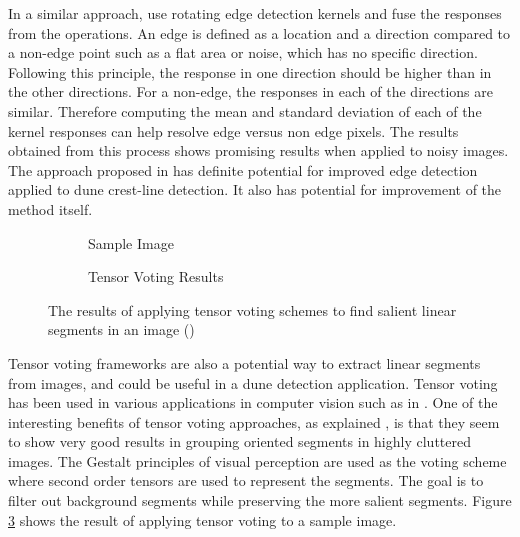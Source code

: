 In a similar approach, \cite{Image_Edge_detection_Rotating_Kernel_Transformation} use rotating edge detection kernels and fuse the responses from the operations. An edge is defined as a location and a direction compared to a non-edge point such as a flat area or noise, which has no specific direction. Following this principle, the response in one direction should be higher than in the other directions. For a non-edge, the	responses in each of the directions are similar. Therefore computing the mean and standard deviation of each of the kernel responses can help resolve edge versus non edge pixels. The results obtained from this process shows promising results when applied to noisy images. The approach proposed in \cite{Image_Edge_detection_Rotating_Kernel_Transformation} has definite potential for improved edge detection applied to dune crest-line detection. It also has potential for improvement of the method itself.

\begin{figure}
	\centering
	\begin{subfigure}{0.35\textwidth}
		\centering
		\caption{ Sample Image }
		\label{fig:tensor_voting_input}
	\end{subfigure}
	\begin{subfigure}{0.35\textwidth}
		\centering
		\caption{ Tensor Voting Results }
		\label{fig:tensor_voting_output}
	\end{subfigure}
	\caption{ The results of applying tensor voting schemes to find salient linear segments in an image (\cite{2009_tensor_voting_cluttered_backgrounds}) }
	\label{fig:tensor_voting_results}
\end{figure}

Tensor voting frameworks are also a potential way to extract linear segments from images, and could be useful in a dune detection application. Tensor voting has been used in various applications in computer vision such as in \cite{2006_tensor_voting_video_repairing,2005_tensor_voting_image_correction,2006_tensor_voting_stereo_monocular,2005_tensor_voting_visual_motion_analysis,2001_tensor_voting_epipolar_geometry}. One of the interesting benefits of tensor voting approaches, as explained \cite{2009_tensor_voting_cluttered_backgrounds}, is that they seem to show very good results in grouping oriented segments in highly cluttered images. The Gestalt principles of visual perception are used as the voting scheme where second order tensors are used to represent the segments. The goal is to filter out background segments while preserving the more salient segments. Figure \ref{fig:tensor_voting_results} shows the result of applying tensor voting to a sample image.

